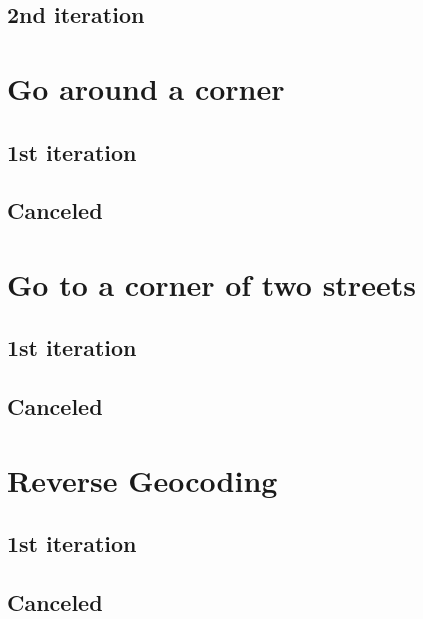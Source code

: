 			\subsection{2nd iteration}
		\section{Go around a corner}
			\subsection{1st iteration}
			\subsection{Canceled}
		\section{Go to a corner of two streets}
			\subsection{1st iteration}
			\subsection{Canceled}
		\section{Reverse Geocoding}
			\subsection{1st iteration}
			\subsection{Canceled}
		
		